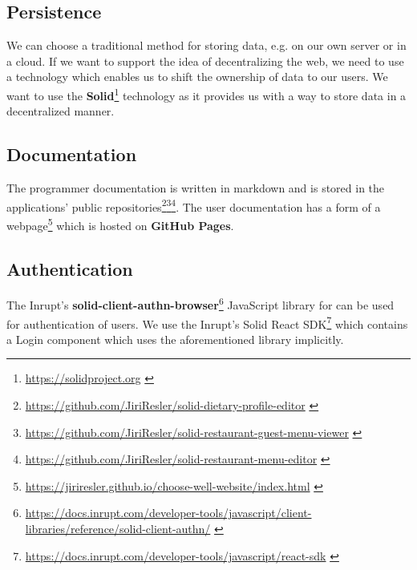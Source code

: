 \subsection*{Persistence}
We can choose a traditional method for storing data, e.g. on our own server or in a cloud.
If we want to support the idea of decentralizing the web, we need to use a technology which enables us to shift the ownership of data to our users.
We want to use the \textbf{Solid}\footnote{\url{https://solidproject.org}  \label{fnlabel}} technology as it provides us with a way to store data in a decentralized manner.

\subsection*{Documentation}
The programmer documentation is written in markdown and is stored in the applications' public repositories\footnote{\url{https://github.com/JiriResler/solid-dietary-profile-editor}  \label{fnlabel}}\footnote{\url{https://github.com/JiriResler/solid-restaurant-guest-menu-viewer}  \label{fnlabel}}\footnote{\url{https://github.com/JiriResler/solid-restaurant-menu-editor}  \label{fnlabel}}.
The user documentation has a form of a webpage\footnote{\url{https://jiriresler.github.io/choose-well-website/index.html}  \label{fnlabel}} which is hosted on \textbf{GitHub Pages}.

\subsection*{Authentication}
The Inrupt's \textbf{solid-client-authn-browser}\footnote{\url{https://docs.inrupt.com/developer-tools/javascript/client-libraries/reference/solid-client-authn/} \label{fnlabel}} JavaScript library for can be used for authentication of users.
We use the Inrupt's Solid React SDK\footnote{\url{https://docs.inrupt.com/developer-tools/javascript/react-sdk} \label{fnlabel}} which contains a Login component which uses the aforementioned library implicitly.